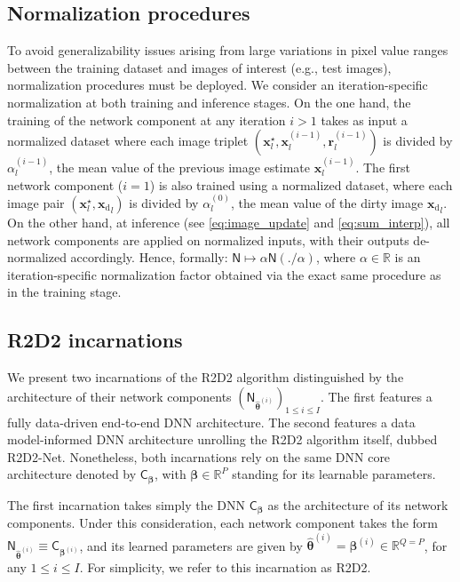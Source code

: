 \documentclass[preprint2,twocolumn]{aastex631}
\newcommand{\xb}{\ensuremath{\boldsymbol{x}}}
\newcommand{\rb}{\ensuremath{\boldsymbol{r}}}
\newcommand{\Nb}{\ensuremath{\boldsymbol{\mathsf{N}}}}
\newcommand{\Cb}{\ensuremath{\boldsymbol{\mathsf{C}}}}
\newcommand{\thetab}{\ensuremath{\boldsymbol{\theta}}}
\newcommand{\betab}{\ensuremath{\boldsymbol{\beta}}}
\newcommand{\eR}{\mathbb{R}}
\begin{document}
\subsection{Normalization procedures}
To avoid generalizability issues arising from large variations in pixel value ranges between the training dataset and images of interest (e.g., test images), normalization procedures must be deployed. We consider an iteration-specific normalization at both training and inference stages. On the one hand, the training of the network component at any iteration $i>1$ takes as input a normalized dataset where each image triplet $(\xb_l^\star,{\xb_l^{(i-1)}},{\rb_l^{(i-1)}})$ is divided by $\alpha^{(i-1)}_l$, the mean value of the previous image estimate ${\xb_l^{(i-1)}}$. The first network component ($i=1$) is also trained using a normalized dataset, where each image pair $(\xb_l^\star,{\xb_{\textrm{d}}}_l)$ is divided by $\alpha^{(0)}_l$, the mean value of the dirty image ${\xb_{\textrm{d}}}_l$. On the other hand, at inference (see \eqref{eq:image_update} and \eqref{eq:sum_interp}), all network components are applied on normalized inputs, with their outputs de-normalized accordingly. Hence, formally: $ {\Nb} \mapsto \alpha {\Nb}(./\alpha)$, where $\alpha \in \eR$ is an iteration-specific normalization factor obtained via the exact same procedure as in the training stage.

\subsection{R2D2 incarnations} \label{subsec:R2D2-incarnations}
We present two incarnations of the R2D2 algorithm distinguished by the architecture of their network components $(\Nb_{\widehat{\thetab}^{(i)}})_{1 \leq i \leq I}$. The first features a fully data-driven end-to-end DNN architecture. The second features a data model-informed DNN architecture unrolling the R2D2 algorithm itself, dubbed R2D2-Net. 
Nonetheless, both incarnations rely on the same DNN core architecture denoted by $\Cb_{\betab}$, with ${\betab}\in \eR^{P}$ standing for its learnable parameters.

The first incarnation takes simply the DNN $\Cb_{\betab}$ as the architecture of its network components. Under this consideration, each network component takes the form $\Nb_{\widehat{\thetab}^{(i)}} \equiv \Cb_{\betab^{(i)}}$, and its learned parameters are given by $\widehat{\thetab}^{(i)}= \betab^{(i)}\in \eR^{Q=P}$, for any $1\leq i \leq I$. For simplicity, we refer to this incarnation as R2D2.
\end{document}
